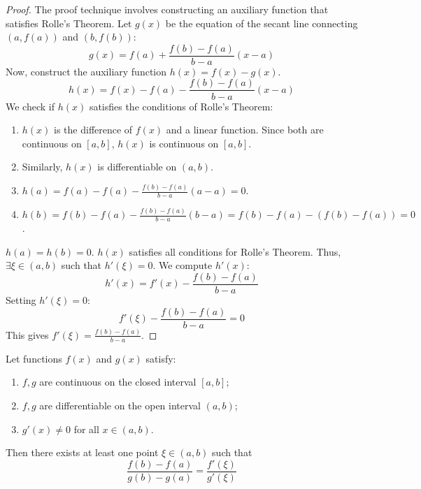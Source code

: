 \documentclass[oneside]{book}
\begin{document}
\begin{proof}
The proof technique involves constructing an auxiliary function that satisfies Rolle's Theorem.
Let $g(x)$ be the equation of the secant line connecting $(a, f(a))$ and $(b, f(b))$:
\[
g(x) = f(a) + \frac{f(b) - f(a)}{b - a} (x - a)
\]
Now, construct the auxiliary function $h(x) = f(x) - g(x)$.
\[
h(x) = f(x) - f(a) - \frac{f(b) - f(a)}{b - a} (x - a)
\]
We check if $h(x)$ satisfies the conditions of Rolle's Theorem:
\begin{enumerate}
    \item $h(x)$ is the difference of $f(x)$ and a linear function. Since both are continuous on $[a, b]$, $h(x)$ is continuous on $[a, b]$.
    \item Similarly, $h(x)$ is differentiable on $(a, b)$.
    \item $h(a) = f(a) - f(a) - \frac{f(b) - f(a)}{b - a} (a - a) = 0$.
    \item $h(b) = f(b) - f(a) - \frac{f(b) - f(a)}{b - a} (b - a) = f(b) - f(a) - (f(b) - f(a)) = 0$.
\end{enumerate}
$h(a) = h(b) = 0$.
$h(x)$ satisfies all conditions for Rolle's Theorem. Thus, $\exists \xi \in (a, b)$ such that $h'(\xi) = 0$.
We compute $h'(x)$:
\[
h'(x) = f'(x) - \frac{f(b) - f(a)}{b - a}
\]
Setting $h'(\xi) = 0$:
\[
f'(\xi) - \frac{f(b) - f(a)}{b - a} = 0
\]
This gives $f'(\xi) = \frac{f(b) - f(a)}{b - a}$.
\end{proof}

\begin{theorem}
\label{thm:cauchy_mvt_en}
Let functions $f(x)$ and $g(x)$ satisfy:
\begin{enumerate}
    \item $f, g$ are continuous on the closed interval $[a, b]$;
    \item $f, g$ are differentiable on the open interval $(a, b)$;
    \item $g'(x) \neq 0$ for all $x \in (a, b)$.
\end{enumerate}
Then there exists at least one point $\xi \in (a, b)$ such that
\[
\frac{f(b) - f(a)}{g(b) - g(a)} = \frac{f'(\xi)}{g'(\xi)}
\]
\end{theorem}
\end{document}
